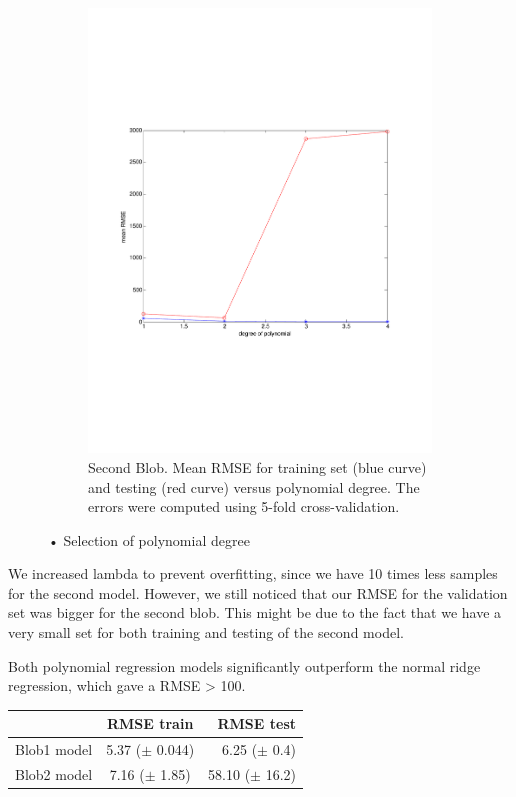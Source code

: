 \documentclass{article} %
\begin{document}
\begin{figure}[h]
\begin{subfigure}[b]{0.45\textwidth}
    \includegraphics[width=\textwidth]{figures/degree_polynomial_blob2_crop.pdf}
    \caption{Second Blob. Mean RMSE for training set (blue curve) and testing (red curve) versus polynomial degree. The errors were computed using 5-fold cross-validation.}
    \label{fig:degre_blob2}
  \end{subfigure}
  \caption{• Selection of polynomial degree}
\end{figure}

We increased lambda to prevent overfitting, since we have 10 times less samples for the second model. However, we still noticed that our RMSE for the validation set  was  bigger for the second blob. This might be due to the fact that we have a very small set for both training and testing of the second model.

Both polynomial regression models significantly outperform the normal ridge regression, which gave a RMSE > 100.

\begin{center}
  \begin{tabular}{ |l | c | r| }
    \hline
     & RMSE train & RMSE test \\ \hline
    Blob1 model & 5.37 ($\pm$ 0.044) & 6.25 ($\pm$ 0.4) \\ \hline
    Blob2 model & 7.16 ($\pm$ 1.85) & 58.10 ($\pm$ 16.2) \\
    \hline
  \end{tabular}
  	\label{table:feat_transform}
\end{center}
\end{document}
